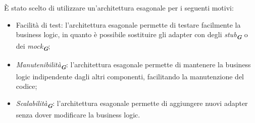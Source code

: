 È stato scelto di utilizzare un'architettura esagonale per i seguenti motivi:
\begin{itemize}
    \item Facilità di test: l'architettura esagonale permette di testare facilmente la business logic, in quanto è possibile sostituire gli adapter con degli \emph{stub}\textsubscript{\textbf{\textit{G}}} o dei \emph{mock}\textsubscript{\textbf{\textit{G}}};
    \item \emph{Manutenibilità}\textsubscript{\textbf{\textit{G}}}: l'architettura esagonale permette di mantenere la business logic indipendente dagli altri componenti, facilitando la manutenzione del codice;
    \item \emph{Scalabilità}\textsubscript{\textbf{\textit{G}}}: l'architettura esagonale permette di aggiungere nuovi adapter senza dover modificare la business logic.
\end{itemize}

